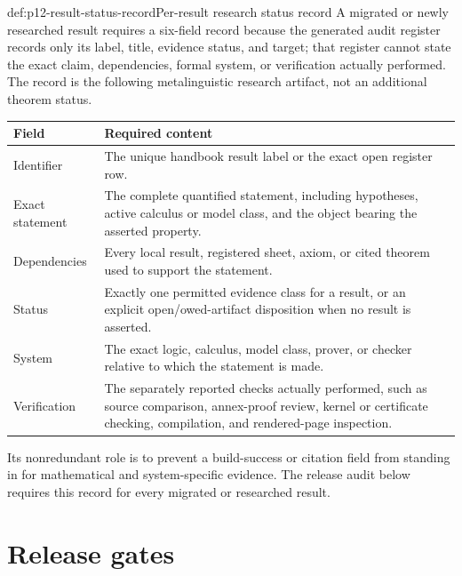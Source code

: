 \begin{hbmethod}{def:p12-result-status-record}{Per-result research status record}
A migrated or newly researched result requires a six-field record because the
generated audit register records only its label, title, evidence status, and
target; that register cannot state the exact claim, dependencies, formal
system, or verification actually performed.  The record is the following
metalinguistic research artifact, not an additional theorem status.
\begin{center}
\small
\begin{tabular}{@{}p{}p{}@{}}
\toprule
Field & Required content \\ \midrule
Identifier & The unique handbook result label or the exact open register row. \\
Exact statement & The complete quantified statement, including hypotheses,
active calculus or model class, and the object bearing the asserted property. \\
Dependencies & Every local result, registered sheet, axiom, or cited theorem
used to support the statement. \\
Status & Exactly one permitted evidence class for a result, or an explicit
open/owed-artifact disposition when no result is asserted. \\
System & The exact logic, calculus, model class, prover, or checker relative
to which the statement is made. \\
Verification & The separately reported checks actually performed, such as
source comparison, annex-proof review, kernel or certificate checking,
compilation, and rendered-page inspection. \\
\bottomrule
\end{tabular}
\end{center}
Its nonredundant role is to prevent a build-success or citation field from
standing in for mathematical and system-specific evidence.  The release audit
below requires this record for every migrated or researched result.
\end{hbmethod}

\section{Release gates}

